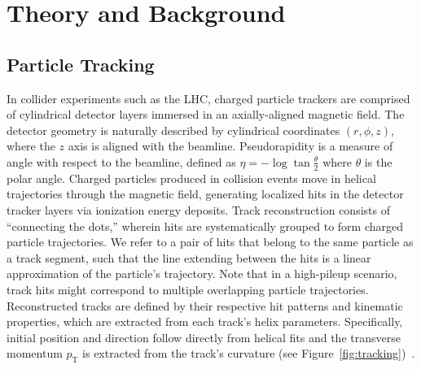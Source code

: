 \documentclass[twocolumn]{svjour3}
\newcommand{\pt}{\ensuremath{p_{\mathrm{T}}}\xspace}
\begin{document}
\section{Theory and Background }
\label{sec:theory}

\subsection{Particle Tracking} 
\label{sec-2.1}

In collider experiments such as the LHC, charged particle trackers are comprised of cylindrical detector layers immersed in an axially-aligned magnetic field. 
The detector geometry is naturally described by cylindrical coordinates $(r,\phi,z)$, where the $z$ axis is aligned with the beamline. 
Pseudorapidity is a measure of angle with respect to the beamline, defined as $\eta=-\log\tan\frac{\theta}{2}$ where $\theta$ is the polar angle.
Charged particles produced in collision events move in helical trajectories through the magnetic field, generating localized hits in the detector tracker layers via ionization energy deposits. 
Track reconstruction consists of ``connecting the dots,'' wherein hits are systematically grouped to form charged particle trajectories. 
We refer to a pair of hits that belong to the same particle as a track segment, such that the line extending between the hits is a linear approximation of the particle's trajectory. 
Note that in a high-pileup scenario, track hits might correspond to multiple overlapping particle trajectories. 
Reconstructed tracks are defined by their respective hit patterns and kinematic properties, which are extracted from each track's helix parameters. 
Specifically, initial position and direction follow directly from helical fits and the transverse momentum $\pt$ is extracted from the track's curvature (see Figure~\ref{fig:tracking})~\cite{tracking}. 
\end{document}
